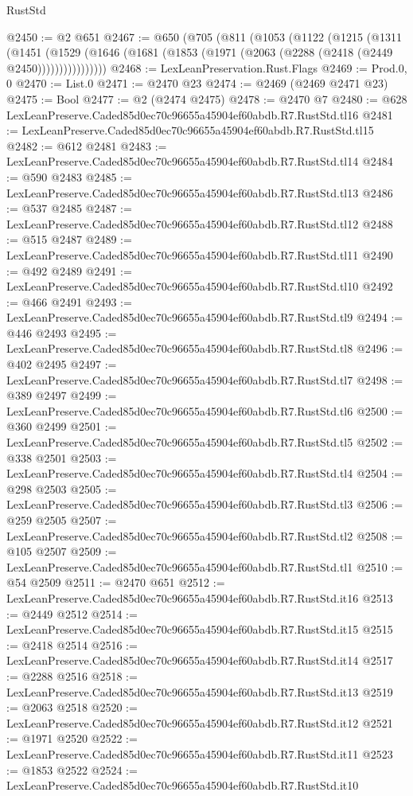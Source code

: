 \begin{lexlean}{RustStd}
\begin{coremodule}
@2450 := @2 @651
@2467 := @650
    (@705
      (@811
        (@1053
          (@1122
            (@1215
              (@1311
                (@1451
                  (@1529
                    (@1646 (@1681 (@1853 (@1971 (@2063 (@2288 (@2418 (@2449 @2450))))))))))))))))
@2468 := LexLeanPreservation.Rust.Flags
@2469 := Prod.{0, 0}
@2470 := List.{0}
@2471 := @2470 @23
@2474 := @2469 (@2469 @2471 @23)
@2475 := Bool
@2477 := @2 (@2474 @2475)
@2478 := @2470 @7
@2480 := @628 LexLeanPreserve.Caded85d0ec70c96655a45904ef60abdb.R7.RustStd.tl16
@2481 := LexLeanPreserve.Caded85d0ec70c96655a45904ef60abdb.R7.RustStd.tl15
@2482 := @612 @2481
@2483 := LexLeanPreserve.Caded85d0ec70c96655a45904ef60abdb.R7.RustStd.tl14
@2484 := @590 @2483
@2485 := LexLeanPreserve.Caded85d0ec70c96655a45904ef60abdb.R7.RustStd.tl13
@2486 := @537 @2485
@2487 := LexLeanPreserve.Caded85d0ec70c96655a45904ef60abdb.R7.RustStd.tl12
@2488 := @515 @2487
@2489 := LexLeanPreserve.Caded85d0ec70c96655a45904ef60abdb.R7.RustStd.tl11
@2490 := @492 @2489
@2491 := LexLeanPreserve.Caded85d0ec70c96655a45904ef60abdb.R7.RustStd.tl10
@2492 := @466 @2491
@2493 := LexLeanPreserve.Caded85d0ec70c96655a45904ef60abdb.R7.RustStd.tl9
@2494 := @446 @2493
@2495 := LexLeanPreserve.Caded85d0ec70c96655a45904ef60abdb.R7.RustStd.tl8
@2496 := @402 @2495
@2497 := LexLeanPreserve.Caded85d0ec70c96655a45904ef60abdb.R7.RustStd.tl7
@2498 := @389 @2497
@2499 := LexLeanPreserve.Caded85d0ec70c96655a45904ef60abdb.R7.RustStd.tl6
@2500 := @360 @2499
@2501 := LexLeanPreserve.Caded85d0ec70c96655a45904ef60abdb.R7.RustStd.tl5
@2502 := @338 @2501
@2503 := LexLeanPreserve.Caded85d0ec70c96655a45904ef60abdb.R7.RustStd.tl4
@2504 := @298 @2503
@2505 := LexLeanPreserve.Caded85d0ec70c96655a45904ef60abdb.R7.RustStd.tl3
@2506 := @259 @2505
@2507 := LexLeanPreserve.Caded85d0ec70c96655a45904ef60abdb.R7.RustStd.tl2
@2508 := @105 @2507
@2509 := LexLeanPreserve.Caded85d0ec70c96655a45904ef60abdb.R7.RustStd.tl1
@2510 := @54 @2509
@2511 := @2470 @651
@2512 := LexLeanPreserve.Caded85d0ec70c96655a45904ef60abdb.R7.RustStd.it16
@2513 := @2449 @2512
@2514 := LexLeanPreserve.Caded85d0ec70c96655a45904ef60abdb.R7.RustStd.it15
@2515 := @2418 @2514
@2516 := LexLeanPreserve.Caded85d0ec70c96655a45904ef60abdb.R7.RustStd.it14
@2517 := @2288 @2516
@2518 := LexLeanPreserve.Caded85d0ec70c96655a45904ef60abdb.R7.RustStd.it13
@2519 := @2063 @2518
@2520 := LexLeanPreserve.Caded85d0ec70c96655a45904ef60abdb.R7.RustStd.it12
@2521 := @1971 @2520
@2522 := LexLeanPreserve.Caded85d0ec70c96655a45904ef60abdb.R7.RustStd.it11
@2523 := @1853 @2522
@2524 := LexLeanPreserve.Caded85d0ec70c96655a45904ef60abdb.R7.RustStd.it10

\end{coremodule}
\end{lexlean}
